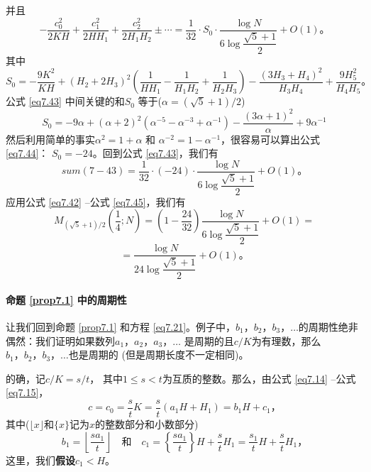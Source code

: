 \documentclass[11pt,a4paper]{article}
\theoremstyle{definition}
\newcommand{\refeq}[1]{公式 \ref{#1}}
\newcommand{\refprop}[1]{命题 \ref{#1}}
\numberwithin{equation}{section}
\newcommand{\comma}{\text{，}}
\newcommand{\juhao}{\text{。}}
\begin{document}
 并且
 \begin{equation}\label{eq7.43}
 -\dfrac{c_{0}^{2}}{2KH}+\dfrac{c_{1}^{2}}{2HH_{1}}+\dfrac{c_{2}^{2}}{2H_{1}H_{2}}\pm\cdots=\dfrac{1}{32}\cdot S_{0}\cdot\dfrac{\log N}{6\log\dfrac{\sqrt{5}+1}{2}}+O(1)\juhao
 \end{equation}
  其中
  \[ S_{0}=-\dfrac{9K^{2}}{KH}+(H_{2}+2H_{3})^{2}\left(\dfrac{1}{HH_{1}}-\dfrac{1}{H_{1}H_{2}}+\dfrac{1}{H_{2}H_{3}}\right)-\dfrac{(3H_{3}+H_{4})^{2}}{H_{3}H_{4}}+\dfrac{9H_{5}^{2}}{H_{4}H_{5}}\juhao\]
  \refeq{eq7.43} 中间关键的和$ S_{0} $ 等于($ \alpha=(\sqrt{5}+1)/2 $)
  \begin{equation}\label{eq7.44}
  S_{0}=-9\alpha+(\alpha+2)^{2}\left(\alpha^{-5}-\alpha^{-3}+\alpha^{-1}\right)-\dfrac{(3\alpha+1)^{2}}{\alpha}+9\alpha^{-1}
  \end{equation}
  然后利用简单的事实$ \alpha^{2}=1+\alpha $ 和 $ \alpha^{-2}=1-\alpha^{-1} $，很容易可以算出\refeq{eq7.44}： $ S_{0}=-24 $。回到\refeq{eq7.43}，我们有
  \begin{equation}\label{eq7.45}
  sum(7-43)=\dfrac{1}{32}\cdot(-24)\cdot\dfrac{\log N}{6\log\dfrac{\sqrt{5}+1}{2}}+O(1)\juhao
  \end{equation}
  应用\refeq{eq7.42} --\refeq{eq7.45}，我们有
  \[ M_{(\sqrt{5}+1)/2}\left(\dfrac{1}{4};N\right)=\left(1-\dfrac{24}{32}\right)\dfrac{\log N}{6\log\dfrac{\sqrt{5}+1}{2}}+O(1)= \]
  \begin{equation}\label{eq7.46}
  =\dfrac{\log N}{24\log\dfrac{\sqrt{5}+1}{2}}+O(1)\juhao 
  \end{equation}
  
 \paragraph{\refprop{prop7.1} 中的周期性}
 让我们回到\refprop{prop7.1} 和方程 \ref{eq7.21}。例子中，$ b_{1}\comma b_{2}\comma b_{3}\comma\ldots$的周期性绝非偶然：我们证明如果数列$ a_{1}\comma a_{2}\comma a_{3}\comma\ldots$ 是周期的且$ c/K $为有理数，那么$ b_{1}\comma b_{2}\comma b_{3}\comma\ldots$也是周期的 (但是周期长度不一定相同)。
 
 的确，记$ c/K=s/t $， 其中$ 1\leq s<t $为互质的整数。那么，由\refeq{eq7.14} --\refeq{eq7.15}，
 \[ c=c_{0}=\dfrac{s}{t}K=\dfrac{s}{t}\left(a_{1}H+H_{1}\right)=b_{1}H+c_{1}\comma \]
 其中($ \lfloor x\rfloor $和$ \lbrace x\rbrace $记为$ x $的整数部分和小数部分)
 \[ b_{1}=\left\lfloor \dfrac{sa_{1}}{t}\right\rfloor\quad \text{和}\quad c_{1}=\left\lbrace\dfrac{sa_{1}}{t} \right\rbrace H+\dfrac{s}{t}H_{1}= \dfrac{s_{1}}{t}H+\dfrac{s}{t}H_{1}\comma \]
 这里，我们\textbf{假设}$ c_{1}<H $。
 
\end{document}
